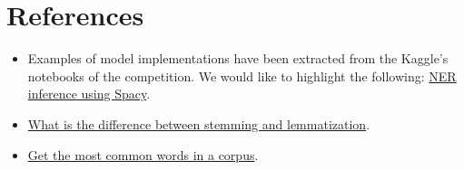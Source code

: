 \documentclass[11pt]{article}
\begin{document}
\section{References}

\begin{itemize}
    \item Examples of model implementations have been extracted from the Kaggle's notebooks of the competition. We would like to highlight the following: \href{https://www.kaggle.com/rohitsingh9990/ner-inference-using-spacy-lb-0-628}{NER inference using Spacy}.
    \item \href{https://blog.bitext.com/what-is-the-difference-between-stemming-and-lemmatization/}{What is the difference between stemming and lemmatization}.
    \item \href{https://medium.com/@cristhianboujon/how-to-list-the-most-common-words-from-text-corpus-using-scikit-learn-dad4d0cab41d}{Get the most common words in a corpus}.
\end{itemize}
\end{document}
